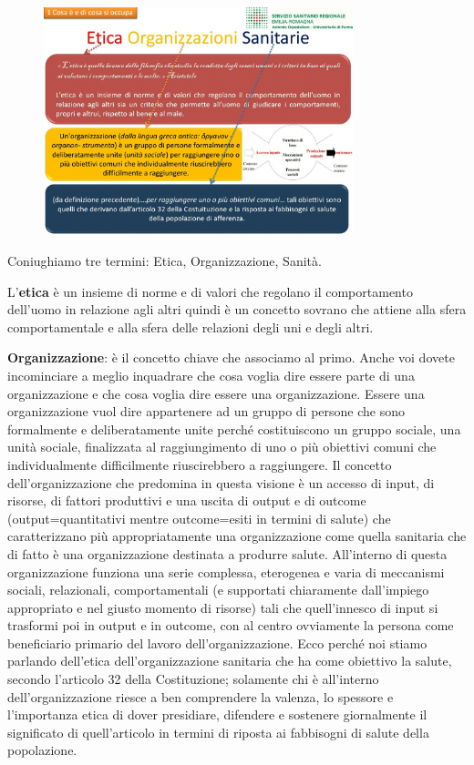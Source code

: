  \begin{figure}[!ht]
\centering
	\includegraphics[width=0.8\textwidth]{32/image3.jpeg}
	\end{figure}

Coniughiamo tre termini: Etica, Organizzazione, Sanità.

L'\textbf{etica} è un insieme di norme e di valori che regolano il
comportamento dell'uomo in relazione agli altri quindi è un concetto
sovrano che attiene alla sfera comportamentale e alla sfera delle
relazioni degli uni e degli altri.

\textbf{Organizzazione}: è il concetto chiave che associamo al primo.
Anche voi dovete incominciare a meglio inquadrare che cosa voglia dire
essere parte di una organizzazione e che cosa voglia dire essere una
organizzazione. Essere una organizzazione vuol dire appartenere ad un
gruppo di persone che sono formalmente e deliberatamente unite perché
costituiscono un gruppo sociale, una unità sociale, finalizzata al
raggiungimento di uno o più obiettivi comuni che individualmente
difficilmente riuscirebbero a raggiungere. Il concetto
dell'organizzazione che predomina in questa visione è un accesso di
input, di risorse, di fattori produttivi e una uscita di output e di
outcome (output=quantitativi mentre outcome=esiti in termini di salute)
che caratterizzano più appropriatamente una organizzazione come quella
sanitaria che di fatto è una organizzazione destinata a produrre salute.
All'interno di questa organizzazione funziona una serie complessa,
eterogenea e varia di meccanismi sociali, relazionali, comportamentali
(e supportati chiaramente dall'impiego appropriato e nel giusto momento
di risorse) tali che quell'innesco di input si trasformi poi in output e
in outcome, con al centro ovviamente la persona come beneficiario
primario del lavoro dell'organizzazione. Ecco perché noi stiamo parlando
dell'etica dell'organizzazione sanitaria che ha come obiettivo la
salute, secondo l'articolo 32 della Costituzione; solamente chi è
all'interno dell'organizzazione riesce a ben comprendere la valenza, lo
spessore e l'importanza etica di dover presidiare, difendere e sostenere
giornalmente il significato di quell'articolo in termini di riposta ai
fabbisogni di salute della popolazione.

